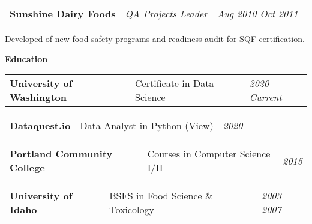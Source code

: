 \documentclass[letterpaper,12pt]{article}[leftmargin=*]
\newcommand{\education}[2]{\vspace{6pt}
  \colorbox{Copper}{\color{white}#1\hspace{9pt}\raggedbottom\normalsize\textbf{#2\hspace{4pt}}}
}
\newcommand{\resumeSectionStart}{\begin{itemize}[leftmargin=0.1in]}
\newcommand{\resumeSectionEnd}{\end{itemize}}
\newcommand{\resumeExperience}[3]{
  \vspace{-3pt}
  \item[]
    \begin{tabularx}{0.97\textwidth}{>{\raggedright}X >{\raggedright\arraybackslash}X >{\raggedleft\arraybackslash}X}
      \textbf{\color{primary}#1} & \textit{\color{accent}#2} & \textit{\color{accent}\small#3} \\
    \end{tabularx}
}
\newcommand{\resumeEducation}[3]{
  \vspace{-1pt}
  \item[]
    \begin{tabularx}{0.97\textwidth}[t]{>{\raggedright}X >{\raggedright\arraybackslash}X >{\raggedleft\arraybackslash}X}
      \textbf{\color{primary}#1} & {\small#2} & \textit{\color{accent}\small#3} \\
    \end{tabularx}
  \vspace{-3pt}
}
\begin{document}
\resumeSectionStart{
  \resumeExperience{Sunshine Dairy Foods}{QA Projects Leader}{Aug 2010 \textemdash{} Oct 2011}
  Developed of new food safety programs and readiness audit for SQF certification.
}
\vspace{-6pt}
\resumeSectionEnd{}




\education{\faGraduationCap}{Education}

\resumeSectionStart{

  \resumeEducation{University of Washington}{Certificate in Data Science}{2020 \textemdash{} Current}

  \resumeEducation{Dataquest.io}{\href{https://app.dataquest.io/view_cert/G76HQZAT7X8UQNXKR3LR/}{\underline{Data Analyst in Python}} (View)}{2020}

  \resumeEducation{Portland Community College}{Courses in Computer Science I/II}{2015}

  \resumeEducation{University of Idaho}{BSFS in Food Science \& Toxicology}{2003 \textemdash{} 2007}

}
\resumeSectionEnd{}
\end{document}
